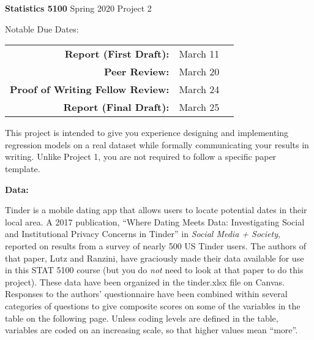 \documentclass[12pt]{report}
\begin{document}
\Large
\begin{center}
   {\bf Statistics 5100} \hspace{3em} Spring 2020\hspace{3em} 
   Project 2\\
\end{center}
\normalsize

\vspace{1em}

Notable Due Dates:

\vspace{1em}
\begin{tabular}{r l l}
{\bf Report (First Draft):} & March 11 \\
{\bf Peer Review:} & March 20 \\
{\bf Proof of Writing Fellow Review:} & March 24 \\
{\bf Report (Final Draft):} & March 25 \\
\end{tabular}

\vspace{1em}

This project is intended to give you experience designing and implementing regression models on a real dataset while formally communicating your results in writing. Unlike Project 1, you are not required to follow a specific paper template.

\vspace{1em}

\large{\bf Data:}\\
\normalsize

Tinder is a mobile dating app that allows users to locate potential dates in their local area.
A 2017 publication, ``Where Dating Meets Data: Investigating
 Social and Institutional Privacy Concerns in Tinder'' in {\it Social Media + Society}, reported on results from a survey of
 nearly 500 US Tinder users.  The authors of that paper, Lutz and Ranzini, have graciously made their data available
for use in this STAT 5100 course (but you do {\it not} need to look at that paper to do this project).
These data have been organized in the tinder.xlsx file on Canvas.\\

Responses to the authors' questionnaire have been combined within several categories of questions
to give composite scores on some of the variables in the table on the following page.
Unless coding levels are defined in the table, variables
are coded on an increasing scale, so that higher values mean ``more''.\\
\end{document}
